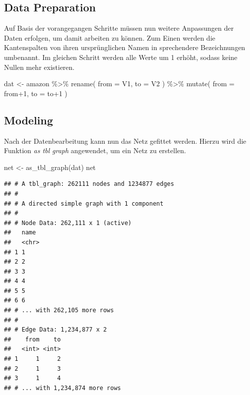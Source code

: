 \documentclass[
  12 pt,
]{article}
\newenvironment{Shaded}{\begin{snugshade}}{\end{snugshade}}
\newcommand{\AttributeTok}[1]{\textcolor[rgb]{0.77,0.63,0.00}{#1}}
\newcommand{\DecValTok}[1]{\textcolor[rgb]{0.00,0.00,0.81}{#1}}
\newcommand{\FunctionTok}[1]{\textcolor[rgb]{0.00,0.00,0.00}{#1}}
\newcommand{\NormalTok}[1]{#1}
\newcommand{\OtherTok}[1]{\textcolor[rgb]{0.56,0.35,0.01}{#1}}
\newcommand{\SpecialCharTok}[1]{\textcolor[rgb]{0.00,0.00,0.00}{#1}}
\begin{document}
\hypertarget{data-preparation}{%
\subsection{Data Preparation}\label{data-preparation}}

Auf Basis der vorangegangen Schritte müssen nun weitere Anpassungen der
Daten erfolgen, um damit arbeiten zu können. Zum Einen werden die
Kantenspalten von ihren ursprünglichen Namen in sprechendere
Bezeichnungen umbenannt. Im gleichen Schritt werden alle Werte um 1
erhöht, sodass keine Nullen mehr existieren.\\

\begin{Shaded}
\begin{Highlighting}[]
\NormalTok{dat }\OtherTok{\textless{}{-}}\NormalTok{ amazon }\SpecialCharTok{\%\textgreater{}\%} 
  \FunctionTok{rename}\NormalTok{(}
    \AttributeTok{from =}\NormalTok{ V1,}
    \AttributeTok{to =}\NormalTok{ V2}
\NormalTok{  ) }\SpecialCharTok{\%\textgreater{}\%} 
  \FunctionTok{mutate}\NormalTok{(}
    \AttributeTok{from =}\NormalTok{ from}\SpecialCharTok{+}\DecValTok{1}\NormalTok{,}
    \AttributeTok{to =}\NormalTok{ to}\SpecialCharTok{+}\DecValTok{1}
\NormalTok{  )}
\end{Highlighting}
\end{Shaded}

\hypertarget{modeling}{%
\subsection{Modeling}\label{modeling}}

Nach der Datenbearbeitung kann nun das Netz gefittet werden. Hierzu wird
die Funktion \textit{as tbl graph} angewendet, um ein Netz zu
erstellen.\\

\begin{Shaded}
\begin{Highlighting}[]
\NormalTok{net }\OtherTok{\textless{}{-}} \FunctionTok{as\_tbl\_graph}\NormalTok{(dat)}
\NormalTok{net}
\end{Highlighting}
\end{Shaded}

\begin{verbatim}
## # A tbl_graph: 262111 nodes and 1234877 edges
## #
## # A directed simple graph with 1 component
## #
## # Node Data: 262,111 x 1 (active)
##   name 
##   <chr>
## 1 1    
## 2 2    
## 3 3    
## 4 4    
## 5 5    
## 6 6    
## # ... with 262,105 more rows
## #
## # Edge Data: 1,234,877 x 2
##    from    to
##   <int> <int>
## 1     1     2
## 2     1     3
## 3     1     4
## # ... with 1,234,874 more rows
\end{verbatim}
\end{document}
